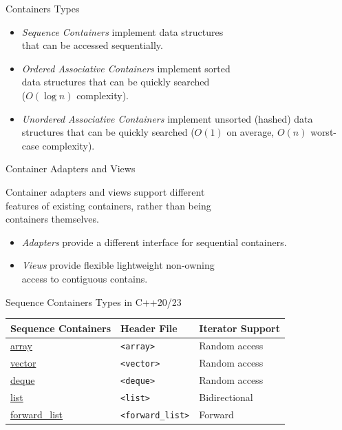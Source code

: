 \documentclass[14pt,aspectratio=1610]{beamer}
\begin{document}
\begin{frame}{Containers Types}
\begin{itemize}[<+->]
\item
  \emph{Sequence Containers} implement data structures \\that can be accessed sequentially.
\item
  \emph{Ordered Associative Containers} implement sorted\\ data structures that can be quickly searched\\ (\(O(\log n)\) complexity).
\item
  \emph{Unordered Associative Containers} implement unsorted (hashed) data structures that can be quickly searched (\(O(1)\) on average, \(O(n)\) worst-case complexity).
\end{itemize}
\end{frame}

\begin{frame}{Container Adapters and Views}

Container adapters and views support different\\
features of existing containers, rather than being\\
containers themselves.

\begin{itemize}[<+->]
\item
  \emph{Adapters} provide a different interface for sequential containers.
\item
  \emph{Views} provide flexible lightweight non-owning \\access to contiguous contains.
\end{itemize}
\end{frame}

\begin{frame}{Sequence Containers Types in C++20/23}
\renewcommand{\arraystretch}{1.1}
\begin{tabular}{l l l}
\toprule
  \textbf{Sequence Containers} & \textbf{Header File} & \textbf{Iterator Support}\\
  \midrule
  \href{https://en.cppreference.com/w/cpp/container/array}{array}
    & \lstinline{<array>} & Random access\\
  \href{https://en.cppreference.com/w/cpp/container/vector}{vector}
    & \lstinline{<vector>} & Random access\\
  \href{https://en.cppreference.com/w/cpp/container/deque}{deque}
    & \lstinline{<deque>} & Random access\\
    \href{https://en.cppreference.com/w/cpp/container/list}{list}
    & \lstinline{<list>} & Bidirectional\\
  \href{https://en.cppreference.com/w/cpp/container/forward_list}{forward\_list}
    & \lstinline{<forward_list>} & Forward\\
\bottomrule
\end{tabular}
\end{frame}
\end{document}
